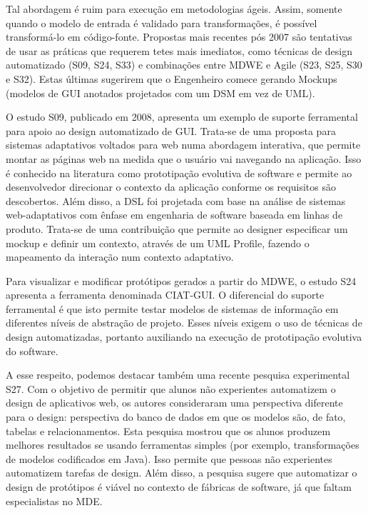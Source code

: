 Tal abordagem é ruim para execução em metodologias ágeis. Assim, somente quando o modelo de entrada é validado para transformações, é possível transformá-lo em código-fonte. Propostas mais recentes pós 2007 são tentativas de usar as práticas que requerem tetes mais imediatos, como técnicas de design automatizado (S09, S24, S33) e combinações entre MDWE e Agile (S23, S25, S30 e S32). Estas últimas sugerirem que o Engenheiro comece gerando Mockups (modelos de GUI anotados projetados com um DSM em vez de UML). %


O estudo S09, publicado em 2008, apresenta um exemplo de suporte ferramental para apoio ao design automatizado de GUI. Trata-se de uma proposta para sistemas adaptativos voltados para web numa abordagem interativa, que permite montar as páginas web na medida que o usuário vai navegando na aplicação. Isso é conhecido na literatura como prototipação evolutiva de software e permite ao desenvolvedor direcionar o contexto da aplicação conforme os requisitos são descobertos. Além disso, a DSL foi projetada com base na análise de sistemas web-adaptativos com ênfase em engenharia de software baseada em linhas de produto. Trata-se de uma contribuição que permite ao designer especificar um mockup e definir um contexto, através de um UML Profile, fazendo o mapeamento da interação num contexto adaptativo.

Para visualizar e modificar protótipos gerados a partir do MDWE, o estudo S24 apresenta a ferramenta denominada CIAT-GUI. O diferencial do suporte ferramental é que isto permite testar modelos de sistemas de informação em diferentes níveis de abstração de projeto. Esses níveis exigem o uso de técnicas de design automatizadas, portanto auxiliando na execução de prototipação evolutiva do software.

A esse respeito, podemos destacar também uma recente pesquisa experimental S27. Com o objetivo de permitir que alunos não experientes automatizem o design de aplicativos web, os autores consideraram uma perspectiva diferente para o design: perspectiva do banco de dados em que os modelos são, de fato, tabelas e relacionamentos. Esta pesquisa mostrou que os alunos produzem melhores resultados se usando ferramentas simples (por exemplo, transformações de modelos codificados em Java). Isso permite que pessoas não experientes automatizem tarefas de design. Além disso, a pesquisa sugere que automatizar o design de protótipos é viável no contexto de fábricas de software, já que faltam especialistas no MDE.


